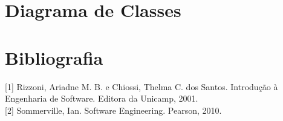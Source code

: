 \documentclass[12pt,a4paper]{article}
\begin{document}
\section{Diagrama de Classes}

\section{Bibliografia}
[1]  Rizzoni, Ariadne M. B. e Chiossi, Thelma C. dos Santos. Introdução à Engenharia de Software. Editora da Unicamp, 2001.\\

[2]  Sommerville, Ian. Software Engineering. Pearson, 2010.\\
\end{document}
